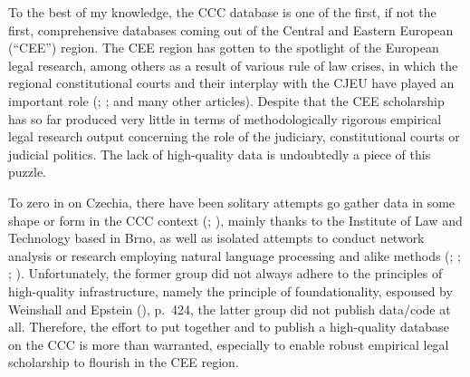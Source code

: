 \documentclass[
  11pt,
]{article}
\begin{document}
To the best of my knowledge, the CCC database is one of the first, if not the first, comprehensive databases coming out of the Central and Eastern European (``CEE'') region. The CEE region has gotten to the spotlight of the European legal research, among others as a result of various rule of law crises, in which the regional constitutional courts and their interplay with the CJEU have played an important role (; ;  and many other articles). Despite that the CEE scholarship has so far produced very little in terms of methodologically rigorous empirical legal research output concerning the role of the judiciary, constitutional courts or judicial politics. The lack of high-quality data is undoubtedly a piece of this puzzle.

To zero in on Czechia, there have been solitary attempts go gather data in some shape or form in the CCC context (; ), mainly thanks to the Institute of Law and Technology based in Brno, as well as isolated attempts to conduct network analysis or research employing natural language processing and alike methods (; ; ; ). Unfortunately, the former group did not always adhere to the principles of high-quality infrastructure, namely the principle of foundationality, espoused by Weinshall and Epstein (), p.~424, the latter group did not publish data/code at all. Therefore, the effort to put together and to publish a high-quality database on the CCC is more than warranted, especially to enable robust empirical legal scholarship to flourish in the CEE region.
\end{document}
